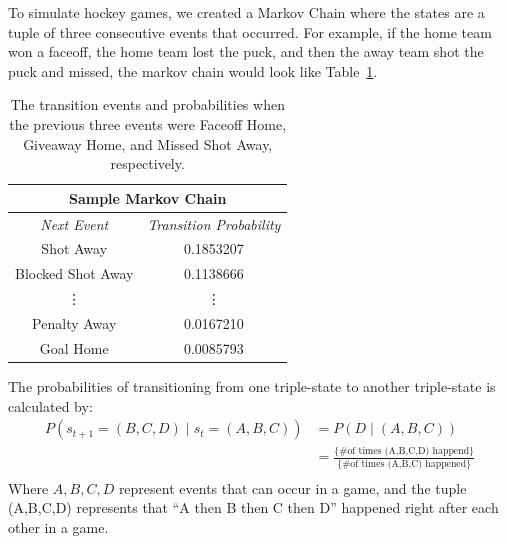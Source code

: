 \documentclass[11pt]{article}
\begin{document}
To simulate hockey games, we created a Markov Chain where the states are a tuple of three consecutive
events that occurred. For example, if the home team won a faceoff, the home team lost the puck, and 
then the away team shot the puck and missed, the markov chain would look like Table~\ref{tab:markov_chain_sample}.

\begin{table}
    \centering
    \begin{tabular}{ |c|c| } 
    \hline
        \multicolumn{2}{|c|}{\textbf{Sample Markov Chain}} \\
     \hline
     \textit{Next Event} & \textit{Transition Probability} \\ 
     \hline
     Shot Away & 0.1853207 \\ 
     \hline
     Blocked Shot Away & 0.1138666 \\ 
     \hline
     \vdots & \vdots \\
    \hline
    Penalty Away & 0.0167210 \\
    \hline
    Goal Home & 0.0085793 \\
    \hline
    \end{tabular}
    \caption{The transition events and probabilities when the previous three events were Faceoff Home, Giveaway Home, and Missed
    Shot Away, respectively.}
    \label{tab:markov_chain_sample}
\end{table}


The probabilities of transitioning from one triple-state to another triple-state is calculated by:
\begin{align*}
    P(s_{t+1} = (B,C,D) \;|\; s_t = (A,B,C)) &= P(D \;|\; (A,B,C)) \\
    &= \frac{\{ \text{\# of times (A,B,C,D) happend}\}}{\{ \text{\# of times (A,B,C) happened}\}} \\
\end{align*}
Where $A,B,C,D$ represent events that can occur in a game, and the tuple (A,B,C,D) represents that ``A then 
B then C then D'' happened right after each other in a game.
\end{document}
